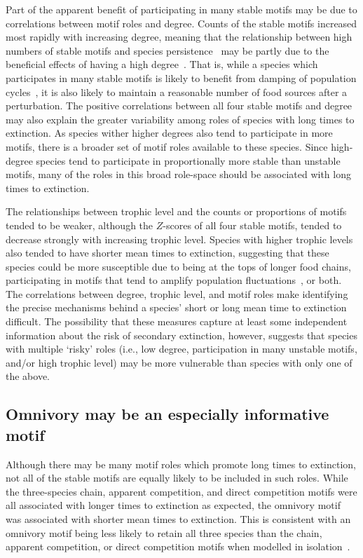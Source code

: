 \documentclass[12pt]{article}
\begin{document}
\begin{spacing}{2.0}
        
        Part of the apparent benefit of participating in many stable motifs may be due to correlations between motif roles and degree.
        Counts of the stable motifs increased most rapidly with increasing degree, meaning that the relationship between high numbers of stable motifs and species persistence~\citep{Stouffer2007,Borrelli2015a} may be partly due to the beneficial effects of having a high degree~\citep{Cirtwill2016a}.
		That is, while a species which participates in many stable motifs is likely to benefit from damping of population cycles~\citep{Borrelli2015a}, it is also likely to maintain a reasonable number of food sources after a perturbation.
		The positive correlations between all four stable motifs and degree may also explain the greater variability among roles of species with long times to extinction.
		As species wither higher degrees also tend to participate in more motifs, there is a broader set of motif roles available to these species.
		Since high-degree species tend to participate in proportionally more stable than unstable motifs, many of the roles in this broad role-space should be associated with long times to extinction.
		
		
        The relationships between trophic level and the counts or proportions of motifs tended to be weaker, although the $Z$-scores of all four stable motifs, tended to decrease strongly with increasing trophic level.
        Species with higher trophic levels also tended to have shorter mean times to extinction, suggesting that these species could be more susceptible due to being at the tops of longer food chains, participating in motifs that tend to amplify population fluctuations~\citep{Borrelli2015a}, or both.
        The correlations between degree, trophic level, and motif roles make identifying the precise mechanisms behind a species' short or long mean time to extinction difficult.
        The possibility that these measures capture at least some independent information about the risk of secondary extinction, however, suggests that species with multiple `risky' roles (i.e., low degree, participation in many unstable motifs, and/or high trophic level) may be more vulnerable than species with only one of the above.

        
    \subsection*{Omnivory may be an especially informative motif}
	    
        Although there may be many motif roles which promote long times to extinction, not all of the stable motifs are equally likely to be included in such roles.
        While the three-species chain, apparent competition, and direct competition motifs were all associated with longer times to extinction as expected, the omnivory motif was associated with shorter mean times to extinction. 
        This is consistent with an omnivory motif being less likely to retain all three species than the chain, apparent competition, or direct competition motifs when modelled in isolation~\citep{Borrelli2015a}. 



\end{spacing}
\end{document}
